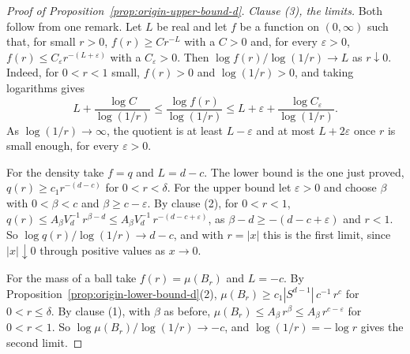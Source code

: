 \begin{proof}[Proof of Proposition~\ref{prop:origin-upper-bound-d}]
\emph{Clause (3), the limits.} Both follow from one remark. Let $L$ be real and let $f$ be a
function on $(0,\infty)$ such that, for small $r > 0$, $f(r) \ge C r^{-L}$ with a $C > 0$ and, for
every $\varepsilon > 0$, $f(r) \le C_\varepsilon r^{-(L+\varepsilon)}$ with a
$C_\varepsilon > 0$. Then $\log f(r)/\log(1/r) \to L$ as $r \downarrow 0$. Indeed, for
$0 < r < 1$ small, $f(r) > 0$ and $\log(1/r) > 0$, and taking logarithms gives
\[
  L + \frac{\log C}{\log(1/r)} \le \frac{\log f(r)}{\log(1/r)}
   \le L + \varepsilon + \frac{\log C_\varepsilon}{\log(1/r)} .
\]
As $\log(1/r) \to \infty$, the quotient is at least $L - \varepsilon$ and at most
$L + 2\varepsilon$ once $r$ is small enough, for every $\varepsilon > 0$.

For the density take $f = q$ and $L = d - c$. The lower bound is the one just proved,
$q(r) \ge c_1 r^{-(d-c)}$ for $0 < r < \delta$. For the upper bound let $\varepsilon > 0$ and
choose $\beta$ with $0 < \beta < c$ and $\beta \ge c - \varepsilon$. By clause (2), for
$0 < r < 1$,
$q(r) \le A_\beta V_d^{-1}\,r^{\beta-d} \le A_\beta V_d^{-1}\,r^{-(d-c+\varepsilon)}$, as
$\beta - d \ge -(d - c + \varepsilon)$ and $r < 1$. So $\log q(r)/\log(1/r) \to d - c$, and with
$r = |x|$ this is the first limit, since $|x| \downarrow 0$ through positive values as $x \to 0$.

For the mass of a ball take $f(r) = \mu(B_r)$ and $L = -c$. By
Proposition~\ref{prop:origin-lower-bound-d}(2), $\mu(B_r) \ge c_1|S^{d-1}|\,c^{-1}\,r^{c}$ for
$0 < r \le \delta$. By clause (1), with $\beta$ as before,
$\mu(B_r) \le A_\beta\,r^{\beta} \le A_\beta\,r^{c-\varepsilon}$ for $0 < r < 1$. So
$\log\mu(B_r)/\log(1/r) \to -c$, and $\log(1/r) = -\log r$ gives the second limit.
\end{proof}

